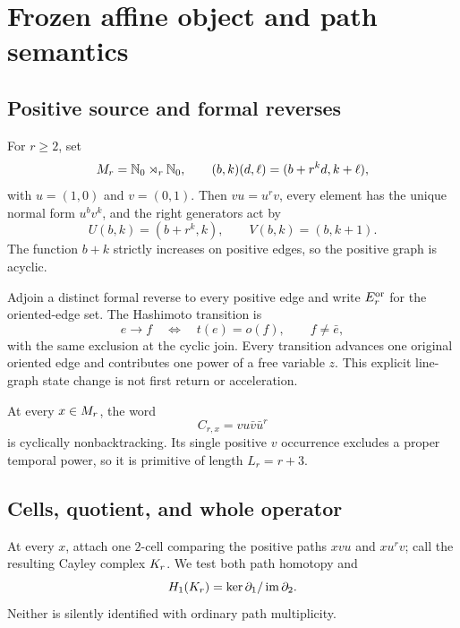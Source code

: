 \section{Frozen affine object and path semantics}
\label{sec:source}

\subsection{Positive source and formal reverses}

For $r\ge2$, set
\begin{equation}
M_r=\mathbb N_0\rtimes_r\mathbb N_0,
\qquad
(b,k)(d,\ell)=(b+r^kd,k+\ell),
\label{eq:affine-product}
\end{equation}
with $u=(1,0)$ and $v=(0,1)$.  Then $vu=u^rv$, every element has the
unique normal form $u^bv^k$, and the right generators act by
\begin{equation}
U(b,k)=(b+r^k,k),
\qquad
V(b,k)=(b,k+1).
\label{eq:right-actions}
\end{equation}
The function $b+k$ strictly increases on positive edges, so the positive
graph is acyclic.

Adjoin a distinct formal reverse to every positive edge and write $E_r^{\mathrm{or}}$ for
the oriented-edge set.  The Hashimoto transition is
\begin{equation}
e\longrightarrow f
\quad\Longleftrightarrow\quad
t(e)=o(f),\qquad f\ne\bar e,
\label{eq:hashimoto}
\end{equation}
with the same exclusion at the cyclic join.  Every transition advances one
original oriented edge and contributes one power of a free variable $z$.
This explicit line-graph state change is not first return or acceleration.

At every $x\in M_r$, the word
\begin{equation}
C_{r,x}=vu\bar v\bar u^r
\label{eq:relation-cycle}
\end{equation}
is cyclically nonbacktracking.  Its single positive $v$ occurrence excludes a
proper temporal power, so it is primitive of length $L_r=r+3$.

\subsection{Cells, quotient, and whole operator}

At every $x$, attach one $2$-cell comparing the positive paths $xvu$ and
$xu^rv$; call the resulting Cayley complex $K_r$.  We test both path homotopy
and
\[
H_1(K_r)=\ker\partial_1/\operatorname{im}\partial_2.
\]
Neither is silently identified with ordinary path multiplicity.

